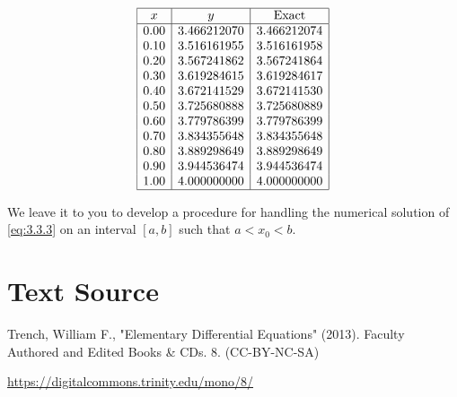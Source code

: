 \documentclass{ximera}
\begin{document}
\begin{example}
\begin{explanation}
$$
\begin{array}{|c|c|c|}
\hline
x&
y&
\text{Exact}\\ \hline
0.00  &   3.466212070 &  3.466212074\\
0.10  &   3.516161955 &  3.516161958\\
0.20  &   3.567241862 &  3.567241864\\
0.30  &   3.619284615 &  3.619284617\\
0.40  &   3.672141529 &  3.672141530\\
0.50  &   3.725680888 &  3.725680889\\
0.60  &   3.779786399 &  3.779786399\\
0.70  &   3.834355648 &  3.834355648\\
0.80  &   3.889298649 &  3.889298649\\
0.90  &   3.944536474 &  3.944536474\\
1.00  &   4.000000000 &  4.000000000\\
\hline
\end{array}
$$

\end{explanation}
\end{example}

We leave it to you to develop a procedure for handling the
numerical solution of \eqref{eq:3.3.3} on an interval $[a,b]$
such that $a<x_0<b$. %


\section*{Text Source}

Trench, William F., "Elementary Differential Equations" (2013). Faculty Authored and Edited Books \& CDs. 8. (CC-BY-NC-SA)

\href{https://digitalcommons.trinity.edu/mono/8/}{https://digitalcommons.trinity.edu/mono/8/} 
\end{document}
